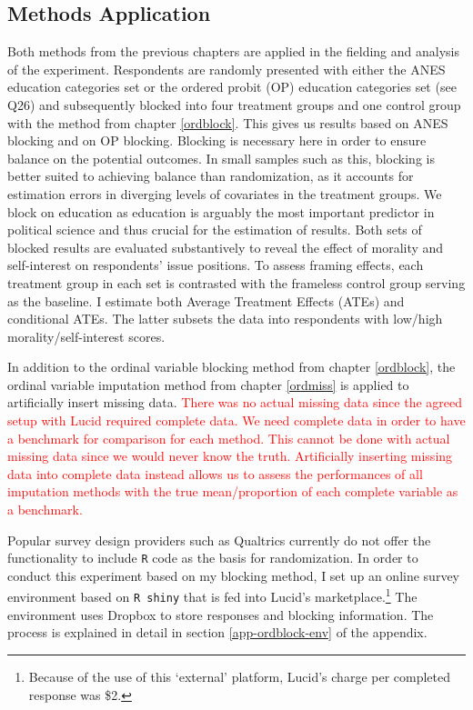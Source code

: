 \documentclass[12pt,econ]{sources/authesis}
\begin{document}
\hypertarget{framing-data-methods}{%
\subsection{Methods Application}\label{framing-data-methods}}

Both methods from the previous chapters are applied in the fielding and analysis of the experiment. Respondents are randomly presented with either the ANES education categories set or the ordered probit (OP) education categories set (see Q26) and subsequently blocked into four treatment groups and one control group with the method from chapter \ref{ordblock}. This gives us results based on ANES blocking and on OP blocking. Blocking is necessary here in order to ensure balance on the potential outcomes. In small samples such as this, blocking is better suited to achieving balance than randomization, as it accounts for estimation errors in diverging levels of covariates in the treatment groups. We block on education as education is arguably the most important predictor in political science and thus crucial for the estimation of results. Both sets of blocked results are evaluated substantively to reveal the effect of morality and self-interest on respondents' issue positions. To assess framing effects, each treatment group in each set is contrasted with the frameless control group serving as the baseline. I estimate both Average Treatment Effects (ATEs) and conditional ATEs. The latter subsets the data into respondents with low/high morality/self-interest scores.

In addition to the ordinal variable blocking method from chapter \ref{ordblock}, the ordinal variable imputation method from chapter \ref{ordmiss} is applied to artificially insert missing data. \textcolor{red}{There was no actual missing data since the agreed setup with Lucid required complete data. We need complete data in order to have a benchmark for comparison for each method. This cannot be done with actual missing data since we would never know the truth. Artificially inserting missing data into complete data instead allows us to assess the performances of all imputation methods with the true mean/proportion of each complete variable as a benchmark.}

Popular survey design providers such as Qualtrics currently do not offer the functionality to include \texttt{R} code as the basis for randomization. In order to conduct this experiment based on my blocking method, I set up an online survey environment based on \texttt{R\ shiny} that is fed into Lucid's marketplace.\footnote{Because of the use of this `external' platform, Lucid's charge per completed response was \$2.} The environment uses Dropbox to store responses and blocking information. The process is explained in detail in section \ref{app-ordblock-env} of the appendix.
\end{document}
